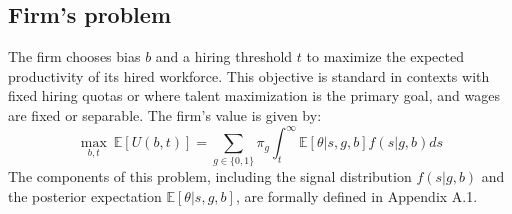 \subsection{Firm's problem}
The firm chooses bias $b$ and a hiring threshold $t$ to maximize the expected productivity of its hired workforce. This objective is standard in contexts with fixed hiring quotas or where talent maximization is the primary goal, and wages are fixed or separable. The firm's value is given by:
\begin{equation}
\max_{b, t} \ \mathbb{E}[U(b,t)] = \sum_{g \in \{0,1\}} \pi_g \int_t^\infty \mathbb{E}[\theta | s, g, b] f(s|g, b) ds
\end{equation}
The components of this problem, including the signal distribution $f(s|g,b)$ and the posterior expectation $\mathbb{E}[\theta|s,g,b]$, are formally defined in Appendix A.1.